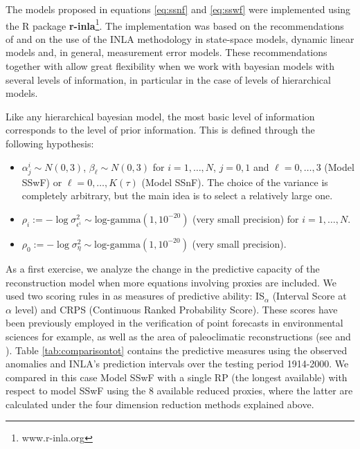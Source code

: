 \documentclass[11pt]{amsart}
\theoremstyle{plain}
\theoremstyle{definition}
\theoremstyle{remark}
\begin{document}
The models proposed in equations \eqref{eq:ssnf} and \eqref{eq:sswf} were
implemented using the R package \textbf{r-inla}\footnote{www.r-inla.org}. The
implementation was based on the recommendations of \cite{Ruiz-Cardenas2012} and
\cite{Muff2015} on the use of the INLA methodology in state-space models,
dynamic linear models and, in general, measurement error models. These
recommendations together with \cite{Martins2013} allow
great flexibility when we work with bayesian models with several levels of
information, in particular in the case of levels of hierarchical models.

Like any hierarchical bayesian model, the most basic level of information
corresponds to the level of prior information. This is defined through the
following hypothesis:
\begin{itemize}
\item $\alpha^i_j\sim N(0,3)$, $\beta_\ell \sim N(0,3)$ for $i=1,\ldots,N$, $j=0,1$ and $\ell=0,\ldots,3$
  (Model SSwF) or $\ell=0,\ldots,K(\tau)$ (Model SSnF). The choice of the variance is
  completely arbitrary, but the main idea is to select a relatively large one.
  
\item $\rho_i := -\log \sigma^2_{\epsilon^i}\sim \text{log-gamma}(1,10^{-20})$
  (very small precision) for $i=1,\ldots,N$.
  
\item $\rho_0 := -\log \sigma^2_\eta \sim \text{log-gamma}(1,10^{-20})$ (very
  small precision).
\end{itemize}

As a first exercise, we analyze the change in the predictive capacity of the
reconstruction model when more equations involving proxies are included. We used
two scoring rules in \cite{Gneiting2007a} as measures of predictive ability:
IS$_\alpha$ (Interval Score at $\alpha$ level) and CRPS (Continuous Ranked
Probability Score). These scores have been previously employed in the
verification of point forecasts in environmental sciences for example, as well as the area
of paleoclimatic reconstructions (see \cite{Barboza2014} and
\cite{Scheuerer2014}). Table \ref{tab:comparisontot} contains the predictive
measures using the observed anomalies and INLA's prediction intervals over the
testing period 1914-2000. We compared in this case Model SSwF with a single RP
(the longest available) with respect to model SSwF using the 8 available reduced
proxies, where the latter are calculated under the four dimension reduction
methods explained above.
\end{document}
